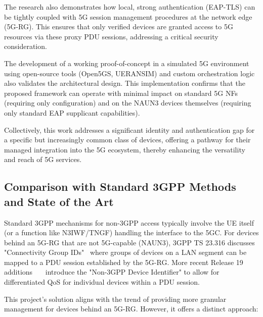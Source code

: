 The research also demonstrates how local, strong authentication (\ac{EAP-TLS}) can be tightly coupled with \ac{5G} session management procedures at the network edge (\ac{5G-RG}). This ensures that only verified devices are granted access to \ac{5G} resources via these proxy \ac{PDU} sessions, addressing a critical security consideration.

The development of a working proof-of-concept in a simulated \ac{5G} environment using open-source tools (Open5GS, UERANSIM) and custom orchestration logic also validates the architectural design. This implementation confirms that the proposed framework can operate with minimal impact on standard \ac{5G} \acp{NF} (requiring only configuration) and on the \ac{NAUN3} devices themselves (requiring only standard \ac{EAP} supplicant capabilities).

Collectively, this work addresses a significant identity and authentication gap for a specific but increasingly common class of devices, offering a pathway for their managed integration into the \ac{5G} ecosystem, thereby enhancing the versatility and reach of \ac{5G} services.

\subsection{Comparison with Standard \acs{3GPP} Methods and State of the Art}

Standard \ac{3GPP} mechanisms for non-\ac{3GPP} access typically involve the \ac{UE} itself (or a function like \ac{N3IWF}/\ac{TNGF}) handling the interface to the \ac{5GC}. For devices behind an \ac{5G-RG} that are not \ac{5G}-capable (\ac{NAUN3}), \ac{3GPP} TS 23.316 discusses "Connectivity Group IDs"~\cite{23.316-p27} where groups of devices on a \ac{LAN} segment can be mapped to a \ac{PDU} session established by the \ac{5G-RG}. More recent Release 19 additions~\cite{23.316-p29}~\cite{23.316-p95}~\cite{23.501-p564} introduce the "Non-\ac{3GPP} Device Identifier" to allow for differentiated \ac{QoS} for individual devices within a \ac{PDU} session.

This project's solution aligns with the trend of providing more granular management for devices behind an \ac{5G-RG}. However, it offers a distinct approach:

